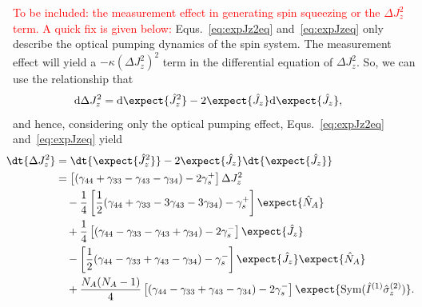 \documentclass[]{report}
\begin{document}
\textcolor{red}{To be included: the measurement effect in generating spin squeezing or the $ \Delta J_z^2 $ term. A quick fix is given below:}
Equs.~\eqref{eq:expJz2eq} and~\eqref{eq:expJzeq} only describe the optical pumping dynamics of the spin system. The measurement effect will yield a $ -\kappa \left(\Delta J_z^2 \right)^2 $ term in the differential equation of $ \Delta J_z^2 $. So, we can use the relationship that
\begin{align}
\mathrm{d} \Delta J_z^2 &= \mathrm{d} \expect{\hat{J}_z^2} - 2\expect{\hat{J}_z}\mathrm{d}\expect{\hat{J}_z},
\end{align}
and hence, considering only the optical pumping effect, Equs.~\eqref{eq:expJz2eq} and~\eqref{eq:expJzeq} yield
\begin{align}
\!\!\!\! \dt{\Delta J_z^2} &= \dt{\expect{\hat{J}_z^2}} - 2\expect{\hat{J}_z}\dt{\expect{\hat{J}_z}}\\
&= \left[(\gamma_{44}+\gamma_{33}-\gamma_{43}-\gamma_{34} ) -2\gamma_s^+\right] \Delta J_z^2\nonumber\\
&\quad -\frac{1}{4}\left[\frac{1}{2}(\gamma_{44}+\gamma_{33}-3\gamma_{43}-3\gamma_{34} ) -\gamma_s^+\right] \expect{\hat{N}_A }\nonumber\\
&\quad +\frac{1}{4}\left[(\gamma_{44}-\gamma_{33}-\gamma_{43}+\gamma_{34} ) -2\gamma_s^-\right] \expect{\hat{J}_z }\nonumber\\
&\quad -\left[\frac{1}{2}(\gamma_{44}-\gamma_{33}+\gamma_{43}-\gamma_{34} ) -\gamma_s^-\right] \expect{\hat{J}_z }\expect{\hat{N}_A}\nonumber\\
&\quad +\frac{N_A(N_A-1)}{4} \left[ (\gamma_{44}-\gamma_{33}+\gamma_{43}-\gamma_{34})  -2\gamma_s^-\right]\expect{\mathrm{Sym}(\hat{I}^{(1)}\hat{\sigma}_z^{(2)} ) }.
\end{align}
\end{document}
